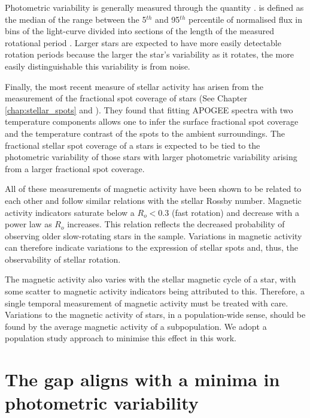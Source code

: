 Photometric variability is generally measured through the quantity \rper{}.
\rper{} is defined as the median of the range between the 5$^{th}$ and 95$^{th}$ percentile of normalised flux in bins of the light-curve divided into sections of the length of the measured rotational period \citep{mcquillan_rotation_2014}.
Larger \rper{} stars are expected to have more easily detectable rotation periods because the larger the star's variability as it rotates, the more easily distinguishable this variability is from noise.

Finally, the most recent measure of stellar activity has arisen from the measurement of the fractional spot coverage of stars (See Chapter \ref{chap:stellar_spots} and \citep{cao_starspots_2022}).
They found that fitting APOGEE spectra with two temperature components allows one to infer the surface fractional spot coverage and the temperature contrast of the spots to the ambient surroundings.
The fractional stellar spot coverage of a stars is expected to be tied to the photometric variability of those stars with larger photometric variability arising from a larger fractional spot coverage.

All of these measurements of magnetic activity have been shown to be related to each other and follow similar relations with the stellar Rossby number.
Magnetic activity indicators saturate below a $R_o<0.3$ \citep{cao_starspots_2022} (fast rotation) and decrease with a power law as $R_o$ increases.
This relation reflects the decreased probability of observing older slow-rotating stars in the \citet{mcquillan_rotation_2014} sample.
Variations in magnetic activity can therefore indicate variations to the expression of stellar spots and, thus, the observability of stellar rotation.

The magnetic activity also varies with the stellar magnetic cycle of a star, with some scatter to magnetic activity indicators being attributed to this.
Therefore, a single temporal measurement of magnetic activity must be treated with care.
Variations to the magnetic activity of stars, in a population-wide sense, should be found by the average magnetic activity of a subpopulation.
We adopt a population study approach to minimise this effect in this work.

\section{The gap aligns with a minima in photometric variability}
\label{sec:minima_rper}

